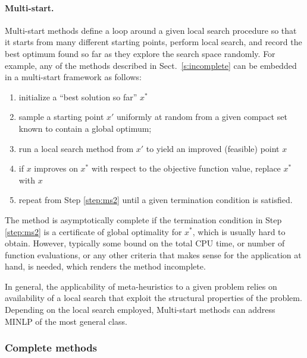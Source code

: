\paragraph{Multi-start.}
%
Multi-start methods define a loop around a given local search procedure so that it starts from many different starting points, perform local search, and record the best optimum found so far as they explore the search space randomly. For example, any of the methods described in Sect.~\ref{s:incomplete} can be embedded in a multi-start framework as follows:
%
\begin{enumerate}
 \item initialize a ``best solution so far'' $x^\ast$ 
 \item sample a starting point $x'$ uniformly at random from a given compact set known to contain a global optimum; \label{step:ms2}
 \item run a local search method from $x'$ to yield an improved (feasible) point $x$
 \item if $x$ improves on $x^\ast$ with respect to the objective function value, replace $x^\ast$ with $x$
 \item repeat from Step \ref{step:ms2} until a given termination condition is satisfied. \label{step:ms5}
\end{enumerate}
%
The method is asymptotically complete if the termination condition in Step \ref{step:ms2} is a certificate of global optimality for $x^\ast$, which is usually hard to obtain. However, typically some bound on the total CPU time, or number of function evaluations, or any other criteria that makes sense for the application at hand, is needed, which renders the method incomplete.

In general, the applicability of meta-heuristics to a given problem relies on availability of a local search that exploit the structural properties of the problem. 
Depending on the local search employed, Multi-start methods can address MINLP of the most general class.

\subsubsection{Complete methods}\label{s:complete}


